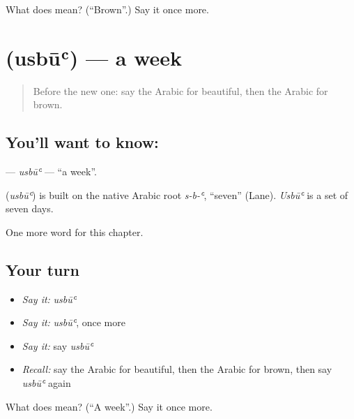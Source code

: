 \begin{tcolorbox}[breakable,colback=teal!4,colframe=teal!35!black,title={Before you move on}]
What does  mean? (\textquotedblleft{}Brown\textquotedblright{}.) Say it once more.
\end{tcolorbox}
\section[\texorpdfstring{\ar{أسبوع} (usbūʿ)}{أسبوع (usbūʿ)}]{ (usbūʿ) — a week}

\label{lesson:AR-C86-usbu}



\begin{quote}
Before the new one: say the Arabic for beautiful, then the Arabic for brown.
\end{quote}

\subsection*{You'll want to know: }
\textbf{} — \emph{usbūʿ} — \textquotedblleft{}a week\textquotedblright{}.

\begin{cousinweb}
\textbf{} (\emph{usbūʿ}) is built on the native Arabic root \emph{s-b-ʿ}, \textquotedblleft{}seven\textquotedblright{} (Lane). \emph{Usbūʿ} is a set of seven days.
\end{cousinweb}

\begin{grammarlens}[title={What you've built}]
One more word for this chapter.
\end{grammarlens}

\subsection*{Your turn}
\begin{itemize}
\raggedright
  \item \emph{Say it:} \emph{usbūʿ}
  \item \emph{Say it:} \emph{usbūʿ}, once more
  \item \emph{Say it:} say \emph{usbūʿ}
  \item \emph{Recall:} say the Arabic for beautiful, then the Arabic for brown, then say \emph{usbūʿ} again
\end{itemize}

\begin{tcolorbox}[breakable,colback=teal!4,colframe=teal!35!black,title={Before you move on}]
What does  mean? (\textquotedblleft{}A week\textquotedblright{}.) Say it once more.
\end{tcolorbox}
